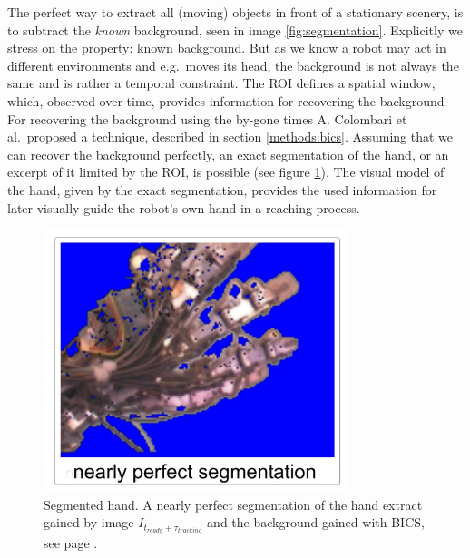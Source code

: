 \documentclass[conference]{IEEEtran}
\begin{document}
The perfect way to extract all (moving) objects in front of a stationary scenery, is to subtract the \textit{known} background, seen in image \ref{fig:segmentation}. Explicitly we stress on the property: known background. But as we know a robot may act in different environments and e.g.\ moves its head, the background is not always the same and is rather a temporal constraint. The ROI defines a spatial window, which, observed over time, provides information for recovering the background. For recovering the background using the by-gone times A. Colombari et al.\ proposed a technique, described in section \ref{methods:bics}. Assuming that we can recover the background perfectly, an exact segmentation of the hand, or an excerpt of it limited by the ROI, is possible (see figure \ref{fig:perfsegm}). The visual model of the hand, given by the exact segmentation, provides the used information for later visually guide the robot's own hand in a reaching process.
%
\begin{figure}[h]
	\begin{center}
		\includegraphics[width=3.5in]{imgs/method/perfsegm.ps}
	\end{center}
		\caption[Segmented hand. ]{Segmented hand. A nearly perfect segmentation of the hand extract gained by image $I_{t_{ready}+\tau_{tracking}}$ and the background gained with BICS, see page \pageref{methods:bics}.}
		\label{fig:perfsegm}
\end{figure}
%
\end{document}
